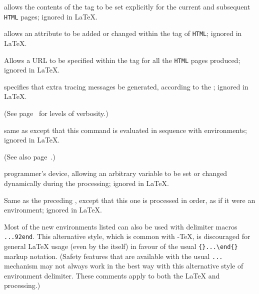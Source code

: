 \begin{htmllist}
allows the contents of the  tag to be set explicitly 
for the current and subsequent \texttt{HTML} pages;\html{\\}
ignored in \LaTeX.
%
\item[%
\htmlref{\Lc{htmlbody}}{htmlbody} ]
allows an attribute to be added or changed 
within the  tag of \texttt{HTML};\html{\\}
ignored in \LaTeX.
%
\item[\htmlref{\Lc{htmlbase}}{htmlbase} ]
Allows a URL to be specified within the  tag
for all the \texttt{HTML} pages produced;\html{\\}
ignored in \LaTeX.
%
\item[\htmlref{\Lc{htmltracing\char123}\Meta{level}\texttt{\char125}}{cs_verbositylevel} ]
specifies that extra tracing messages be generated, according to the ;\html{\\}
ignored in \LaTeX.
\begin{latexonly}
(See page~\pageref{cs_verbositylevel} for levels of verbosity.)
\end{latexonly}
%
\item[\htmlref{\Lc{htmltracenv\char123}\Meta{level}\texttt{\char125}}{cs_verbositylevel} ]
same as  except that this command
is evaluated in sequence with environments;\html{\\}
ignored in \LaTeX.
\begin{latexonly}
(See also page~\pageref{cs_verbositylevel}.)
\end{latexonly}
%
\item[\htmlref{\Lc{HTMLset}}{HTMLset} ]
programmer's device, allowing an arbitrary \Perl{} variable to be set 
or changed dynamically during the \latextohtml{} processing;\html{\\}
ignored in \LaTeX.
%
\item[\htmlref{\Lc{HTMLsetenv}}{HTMLset} ]
Same as the preceding  ,
except that this one is processed in order, 
as if it were an environment;\html{\\}
ignored in \LaTeX.
%
\end{htmllist}

\medskip\htmlrule[width=300]
%
\html{\\}%
\noindent
Most of the new environments listed  can also be used 
with delimiter macros 
\texttt{}\texttt{...\char92end}.
This alternative style, which is common with \AmS-\TeX, is discouraged
for general \LaTeX{} usage (even by the \AmS{} itself) in favour of the usual 
\verb|{|\verb|}...\end{|\verb|}|
markup notation. (Safety features that are available with the usual 
\texttt{...} mechanism may not always work in the best way
with this alternative style of environment delimiter. 
These comments apply to both the \LaTeX{} and \latextohtml{} processing.)

